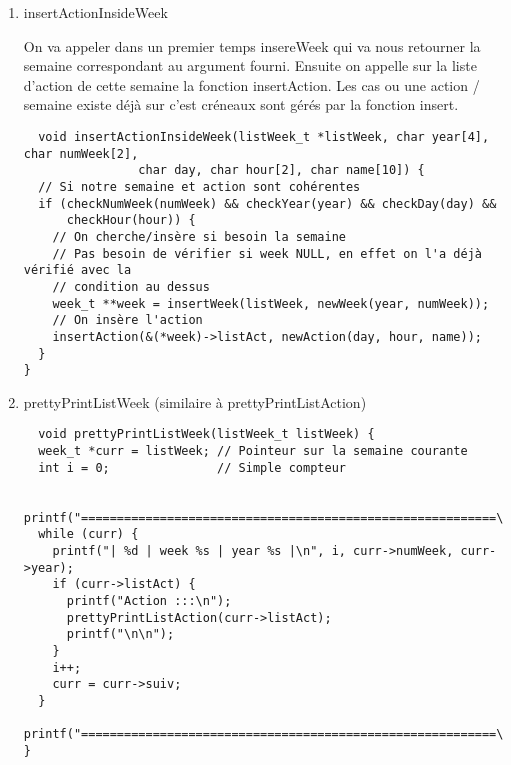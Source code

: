 \documentclass[11pt]{article}
\begin{document}
\begin{enumerate}
\item insertActionInsideWeek
\label{sec:org3750952}

On va appeler dans un premier temps insereWeek qui va nous retourner la semaine
correspondant au argument fourni. Ensuite on appelle sur la liste d'action de cette
semaine la fonction insertAction. Les cas ou une action / semaine existe
déjà sur c'est créneaux sont gérés par la fonction insert.

\begin{lstlisting}
  void insertActionInsideWeek(listWeek_t *listWeek, char year[4], char numWeek[2],
			    char day, char hour[2], char name[10]) {
  // Si notre semaine et action sont cohérentes
  if (checkNumWeek(numWeek) && checkYear(year) && checkDay(day) &&
      checkHour(hour)) {
    // On cherche/insère si besoin la semaine
    // Pas besoin de vérifier si week NULL, en effet on l'a déjà vérifié avec la
    // condition au dessus
    week_t **week = insertWeek(listWeek, newWeek(year, numWeek));
    // On insère l'action
    insertAction(&(*week)->listAct, newAction(day, hour, name));
  }
}
\end{lstlisting}


\item prettyPrintListWeek (similaire à prettyPrintListAction)
\label{sec:org0679ed9}

\begin{lstlisting}
  void prettyPrintListWeek(listWeek_t listWeek) {
  week_t *curr = listWeek; // Pointeur sur la semaine courante
  int i = 0;               // Simple compteur

  printf("==========================================================\n");
  while (curr) {
    printf("| %d | week %s | year %s |\n", i, curr->numWeek, curr->year);
    if (curr->listAct) {
      printf("Action :::\n");
      prettyPrintListAction(curr->listAct);
      printf("\n\n");
    }
    i++;
    curr = curr->suiv;
  }
  printf("==========================================================\n\n");
}
\end{lstlisting}
\end{enumerate}
\end{document}
